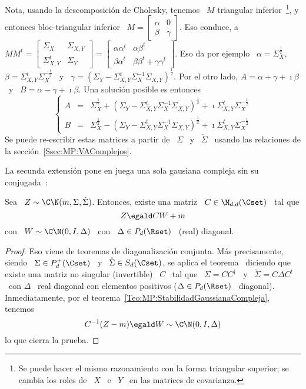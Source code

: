 %
Nota,  usando  la  descomposici\'on   de  Cholesky,  tenemos  \  $M$  triangular
inferior~\footnote{Se puede hacer el  mismo razonamiento con la forma triangular
  superior;  se cambia  los roles  de \  $X$  \ e  \ $Y$  \ en  las matrices  de
  covarianza.},  y  entonces bloc-triangular  inferior  \  $M =  \begin{bmatrix}
  \alpha  &  0  \\  \beta  &  \gamma \end{bmatrix}$.   Eso  conduce,  a  $M  M^t
= \begin{bmatrix} \Sigma_X & \Sigma_{X,Y} \\ \Sigma_{X,Y}^t &
  \Sigma_Y \end{bmatrix}  = \begin{bmatrix} \alpha \alpha^t &  \alpha \beta^t \\
  \beta \alpha^t &  \beta \beta^t + \gamma \gamma^t  \end{bmatrix}$.  Eso da por
ejemplo \   $\alpha    =   \Sigma_X^{\frac12}$,    \    $\beta   =    \Sigma_{X,Y}^t
\Sigma_X^{-\frac12}$ \ y \ $\gamma = \left( \Sigma_Y - \Sigma_{X,Y}^t \Sigma_X^{-1}
  \Sigma_{X,Y} \right)^{\frac12}$.   Por el otro lado,  $A = \alpha  + \gamma +
\imath \beta$ \ y \ $B = \alpha - \gamma + \imath \beta$. Una soluci\'on posible
es entonces
%
\[
\left\{\begin{array}{lll}
A & = & \Sigma_X^{\frac12} + \left( \Sigma_Y - \Sigma_{X,Y}^t \Sigma_X^{-1} \Sigma_{X,Y}
\right)^{\frac12}  + \imath \Sigma_{X,Y}^t
\Sigma_X^{-\frac12}\\[2.5mm]
%
B & = &  \Sigma_X^{\frac12} - \left( \Sigma_Y - \Sigma_{X,Y}^t \Sigma_X^{-1} \Sigma_{X,Y}
\right)^{\frac12} + \imath \Sigma_{X,Y}^t
\Sigma_X^{-\frac12}
\end{array}\right.
\]
%
Se  puede   re-escribir  estas  matrices   a  partir  de   \  $\Sigma$  \   y  \
$\check{\Sigma}$       \      usando       las       relaciones      de       la
secci\'on~\ref{Ssec:MP:VAComplejos}.

La  secunda  extensi\'on  pone  en  juega  una sola  gausiana  compleja  sin  su
conjugada~\cite{EriKoi06, SchSch03}:
%
\begin{teorema}
\label{Teo:MP:GausianaComplejaWIDiago}
%
  Sea \ $Z \sim \C\N(m,\Sigma,\check{\Sigma})$. Entonces, existe una matriz \ $C
  \in \M_{d,d}(\Cset)$ \ tal que
  \[
  Z \egald C W + m
  \]
  con \ $W \sim \C\N(0,I,\Delta)$ \ con \ $\Delta \in P_d(\Rset)$ \ (real) diagonal.
\end{teorema}
\begin{proof}
  Eso  viene  de teoremas  de  diagonalizaci\'on  conjunta. M\'as  precisamente,
  siendo \ $\Sigma  \in P_d^+(\Cset)$ \ y \  $\check{\Sigma} \in S_d(\Cset)$, se
  aplica el  teorema~\cite[Teo.~7.6.5]{HorJoh13} diciendo que  existe una matriz
  no  singular (invertible)  \  $C$ \  tal  que \  $\Sigma  = C  C^\dag$  \ y  \
  $\check{\Sigma} = C  \Delta C^t$ \ con $\Delta$ \  real diagonal con elementos
  positivos  ($\Delta  \in  P_d(\Rset)$  \  diagonal).  Inmediatamente,  por  el
  teorema~\ref{Teo:MP:StabilidadGaussianaCompleja}, tenemos
  \[
  C^{-1} (Z - m) \egald W \sim \C\N(0,I,\Delta)
  \]
  lo que cierra la prueba.
\end{proof}


